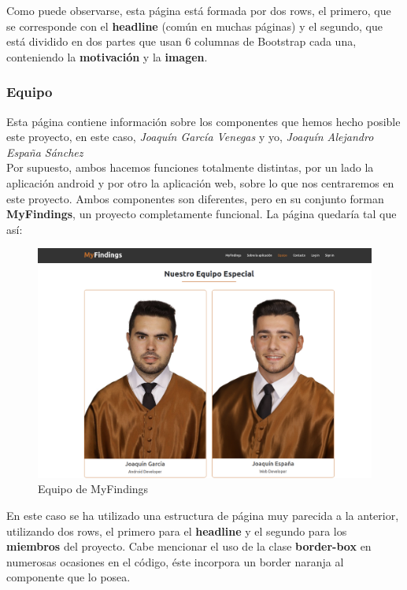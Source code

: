     Como puede observarse, esta página está formada por dos rows, el primero, que se
    corresponde con el \textbf{headline} (común en muchas páginas) y el segundo, que está
    dividido en dos partes que usan 6 columnas de Bootstrap cada una, conteniendo la
    \textbf{motivación} y la \textbf{imagen}.

    \subsubsection{Equipo}
    Esta página contiene información sobre los componentes que hemos hecho posible este
    proyecto, en este caso, \textit{Joaquín García Venegas} y yo, \textit{Joaquín
    Alejandro España Sánchez}\\
    
    Por supuesto, ambos hacemos funciones totalmente distintas, por un lado la aplicación
    android y por otro la aplicación web, sobre lo que nos centraremos en este proyecto.
    Ambos componentes son diferentes, pero en su conjunto forman \textbf{MyFindings},
    un proyecto completamente funcional. La página quedaría tal que así:

        \begin{figure}[H]
            \centering
            \includegraphics[scale=0.25]{imagenes/team.png}
            \caption{Equipo de MyFindings}
            \label{fig:team}
        \end{figure}

    En este caso se ha utilizado una estructura de página muy parecida a la anterior, utilizando
    dos rows, el primero para el \textbf{headline} y el segundo para los \textbf{miembros} del
    proyecto. Cabe mencionar el uso de la clase \textbf{border-box} en numerosas ocasiones en 
    el código, éste incorpora un border naranja al componente que lo posea.

